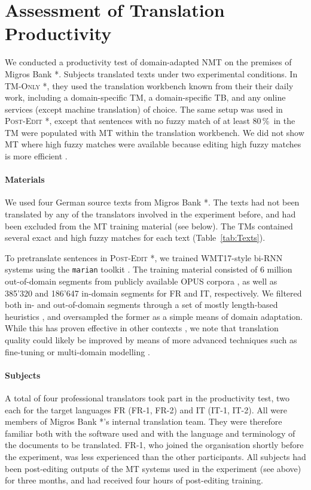 \documentclass[11pt]{article}
\newcommand{\Table}[1]{Table~\ref{tab:#1}}
\newcommand{\eg}{e.\,g.,\ }
\newcommand{\percent}{\,\%\ }
\newcommand{\tm}{\textsc{TM-Only} }
\newcommand{\pe}{\textsc{Post-Edit} }
\newcommand{\thecompany}{Migros Bank }
\begin{document}
\section{Assessment of Translation Productivity}
\label{sec:Main}

We conducted a productivity test of domain-adapted NMT on the premises of \thecompany*. Subjects translated texts under two experimental conditions. In \tm*, they used the translation workbench known from their their daily work, including a domain-specific TM, a domain-specific TB, and any online services (except machine translation) of choice. The same setup was used in \pe*, except that sentences with no fuzzy match of at least 80\percent in the TM were populated with MT within the translation workbench. We did not show MT where high fuzzy matches were available because editing high fuzzy matches is more efficient \citep{SanchezGijon2019}.

\paragraph{Materials} We used four German source texts from \thecompany*. The texts had not been translated by any of the translators involved in the experiment before, and had been excluded from the MT training material (see below). The TMs contained several exact and high fuzzy matches for each text (\Table{Texts}).

To pretranslate sentences in \pe*, we trained WMT17-style bi-RNN systems \citep{Sennrich2017wmt} using the \texttt{marian} toolkit \citep{Junczys2016}. The training material consisted of 6 million out-of-domain segments from publicly available OPUS corpora \citep{OPUS}, as well as 385'320 and 186'647 in-domain segments for FR and IT, respectively. We filtered both in- and out-of-domain segments through a set of mostly length-based heuristics \citep{zwahlen2016tm}, and oversampled the former as a simple means of domain adaptation. While this has proven effective in other contexts \citep[\eg*][]{Sennrich2016WMT}, we note that translation quality could likely be improved by means of more advanced techniques such as fine-tuning \citep{LuongManning2015} or multi-domain modelling \citep{Chu2017}.

\paragraph{Subjects} A total of four professional translators took part in the productivity test, two each for the target languages FR (FR-1, FR-2) and IT (IT-1, IT-2). All were members of \thecompany*'s internal translation team. They were therefore familiar both with the software used and with the language and terminology of the documents to be translated. FR-1, who joined the organisation shortly before the experiment, was less experienced than the other participants. All subjects had been post-editing outputs of the MT systems used in the experiment (see above) for three months, and had received four hours of post-editing training.
\end{document}
